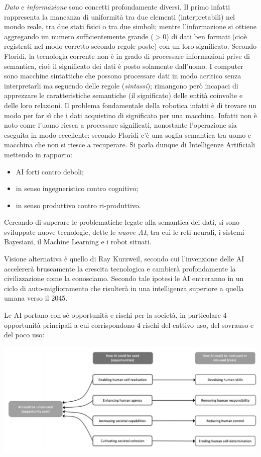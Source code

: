 \documentclass[a4page, 11pt]{article}
\begin{document}
\textit{Dato} e \textit{informazione} sono concetti profondamente diversi.
Il primo infatti rappresenta la mancanza di uniformità tra due elementi (interpretabili) nel mondo reale, tra due stati fisici o tra due simboli; mentre l'informazione si ottiene aggregando un numero sufficientemente grande ($> 0$) di dati ben formati (cioè registrati nel modo corretto secondo regole poste) con un loro significato.
Secondo Floridi, la tecnologia corrente non è in grado di processare informazioni prive di semantica, cioè il significato dei dati è posto solamente dall'uomo.
I computer sono macchine sintattiche che possono processare dati in modo acritico senza interpretarli ma seguendo delle regole (\textit{sintassi}); rimangono però incapaci di apprezzare le caratteristiche semantiche (il significato) delle entità coinvolte e delle loro relazioni.
Il problema fondamentale della robotica infatti è di trovare un modo per far sì che i dati acquistino di significato per una macchina.
Infatti non è noto come l'uomo riesca a processare significati, nonostante l'operazione sia eseguita in modo eccellente: secondo Floridi c'è una soglia semantica tra uomo e macchina che non si riesce a recuperare.
Si parla dunque di Intelligenze Artificiali mettendo in rapporto:
\begin{itemize}
  \item AI forti contro deboli;
  \item in senso ingegneristico contro cognitivo;
  \item in senso produttivo contro ri-produttivo.
\end{itemize}
Cercando di superare le problematiche legate alla semantica dei dati, si sono sviluppate nuove tecnologie, dette le \textit{nuove AI}, tra cui le reti neurali, i sistemi Bayesiani, il Machine Learning e i robot situati.

Visione alternativa è quello di Ray Kurzweil, secondo cui l'invenzione delle AI accelererà bruscamente la crescita tecnologica e cambierà profondamente la civilizzazione come la conosciamo.
Secondo tale ipotesi le AI entreranno in un ciclo di auto-miglioramento che risulterà in una intelligenza superiore a quella umana verso il 2045.

Le AI portano con sé opportunità e rischi per la società, in particolare 4 opportunità principali a cui corrispondono 4 rischi del cattivo uso, del sovrauso e del poco uso:
\begin{center}
	\includegraphics[scale=0.4]{image3.png}
\end{center}
\end{document}
